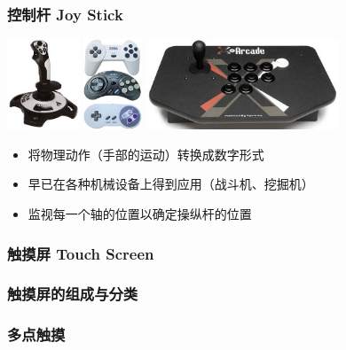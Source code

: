 \documentclass{beamer}
\begin{document}
\begin{frame}
	\frametitle{控制杆 Joy Stick}
	\transwipe
	\begin{center}
	\includegraphics[height=2.7cm]{images/joystick1.jpg}\pause
	\includegraphics[height=2.7cm]{images/joystick2.jpg}\pause
	\includegraphics[height=2.7cm]{images/x-arcade_solo_joystick_640.jpg}\pause
	\end{center}
	\begin{itemize}
		\item 将物理动作（手部的运动）转换成数字形式
		\item 早已在各种机械设备上得到应用（战斗机、挖掘机）
		\item 监视每一个轴的位置以确定操纵杆的位置
	\end{itemize}
\end{frame}

\begin{frame}
	\frametitle{触摸屏 Touch Screen}

\end{frame}

\begin{frame}
	\frametitle{触摸屏的组成与分类}

\end{frame}

\begin{frame}
	\frametitle{多点触摸}

\end{frame}
\end{document}
